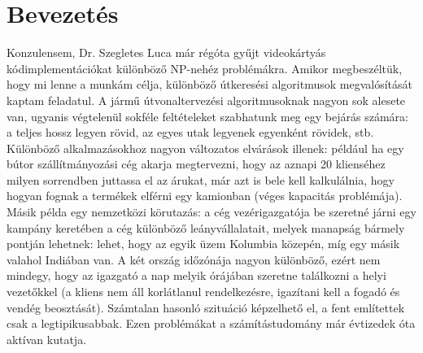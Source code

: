 \chapter{Bevezetés}

Konzulensem, Dr. Szegletes Luca már régóta gyűjt videokártyás kódimplementációkat különböző NP-nehéz problémákra. Amikor megbeszéltük, hogy mi lenne a munkám célja, különböző útkeresési algoritmusok megvalósítását kaptam feladatul. A jármű útvonaltervezési algoritmusoknak nagyon sok alesete van, ugyanis végtelenül sokféle feltételeket szabhatunk meg egy bejárás számára: a teljes hossz legyen rövid, az egyes utak legyenek egyenként rövidek, stb. Különböző alkalmazásokhoz nagyon változatos elvárások illenek: például ha egy bútor szállítmányozási cég akarja megtervezni, hogy az aznapi 20 klienséhez milyen sorrendben juttassa el az árukat, már azt is bele kell kalkulálnia, hogy hogyan fognak a termékek elférni egy kamionban (véges kapacitás problémája). Másik példa egy nemzetközi körutazás: a cég vezérigazgatója be szeretné járni egy kampány keretében a cég különböző leányvállalatait, melyek manapság bármely pontján lehetnek: lehet, hogy az egyik üzem Kolumbia közepén, míg egy másik valahol Indiában van. A két ország időzónája nagyon különböző, ezért nem mindegy, hogy az igazgató a nap melyik órájában szeretne találkozni a helyi vezetőkkel (a kliens nem áll korlátlanul rendelkezésre, igazítani kell a fogadó és vendég beosztását). Számtalan hasonló szituáció képzelhető el, a fent említettek csak a legtipikusabbak. Ezen problémákat a számítástudomány már évtizedek óta aktívan kutatja. 

